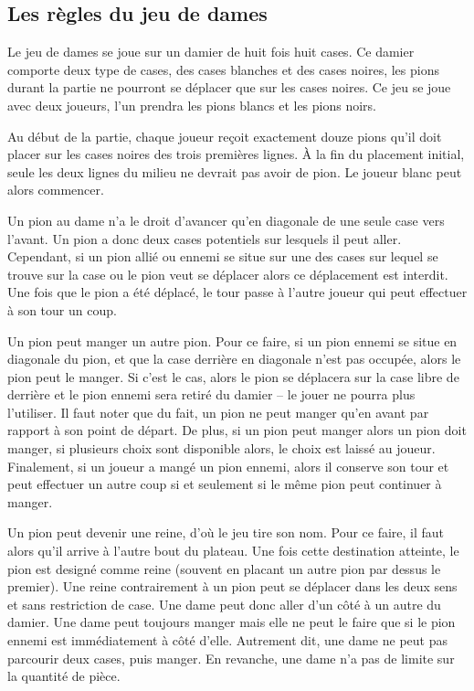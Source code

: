 \documentclass[a4paper,11pt]{article}
\begin{document}
\begin{multicols}{2}[]
  \subsection{Les règles du jeu de dames}

    Le jeu de dames se joue sur un damier de huit fois huit cases. Ce damier
    comporte deux type de cases, des cases blanches et des cases noires, les
    pions durant la partie ne pourront se déplacer que sur les cases noires. Ce
    jeu se joue avec deux joueurs, l'un prendra les pions blancs et les pions
    noirs.

    Au début de la partie, chaque joueur reçoit exactement douze pions qu'il
    doit placer sur les cases noires des trois premières lignes. À la fin du
    placement initial, seule les deux lignes du milieu ne devrait pas avoir de
    pion. Le joueur blanc peut alors commencer.

    Un pion au dame n'a le droit d'avancer qu'en diagonale de une seule case
    vers l'avant. Un pion a donc deux cases potentiels sur lesquels il peut
    aller.  Cependant, si un pion allié ou ennemi se situe sur une des cases
    sur lequel se trouve sur la case ou le pion veut se déplacer alors ce
    déplacement est interdit. Une fois que le pion a été déplacé, le tour passe
    à l'autre joueur qui peut effectuer à son tour un coup.

    Un pion peut manger un autre pion. Pour ce faire, si un pion ennemi se
    situe en diagonale du pion, et que la case derrière en diagonale n'est pas
    occupée, alors le pion peut le manger.  Si c'est le cas, alors le pion se
    déplacera sur la case libre de derrière et le pion ennemi sera retiré du
    damier -- le jouer ne pourra plus l'utiliser. Il faut noter que du fait, un
    pion ne peut manger qu'en avant par rapport à son point de départ. De plus,
    si un pion peut manger alors un pion doit manger, si plusieurs choix sont
    disponible alors, le choix est laissé au joueur. Finalement, si un joueur a
    mangé un pion ennemi, alors il conserve son tour et peut effectuer un autre
    coup si et seulement si le même pion peut continuer à manger.

    Un pion peut devenir une reine, d'où le jeu tire son nom. Pour ce faire, il
    faut alors qu'il arrive à l'autre bout du plateau. Une fois cette
    destination atteinte, le pion est designé comme reine (souvent en placant
    un autre pion par dessus le premier). Une reine contrairement à un pion
    peut se déplacer dans les deux sens et sans restriction de case. Une dame
    peut donc aller d'un côté à un autre du damier. Une dame peut toujours
    manger mais elle ne peut le faire que si le pion ennemi est immédiatement à
    côté d'elle. Autrement dit, une dame ne peut pas parcourir deux cases, puis
    manger. En revanche, une dame n'a pas de limite sur la quantité de pièce.


\end{multicols}
\end{document}

